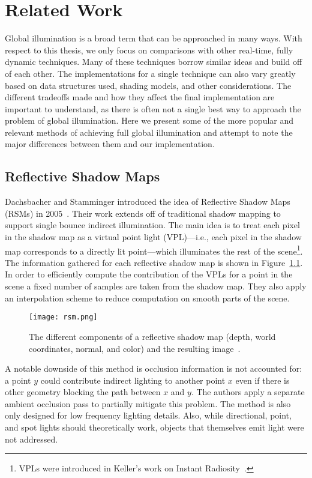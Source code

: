 \chapter{Related Work}

Global illumination is a broad term that can be approached in many ways. With respect to this thesis, we only focus on comparisons with other real-time, fully dynamic techniques. Many of these techniques borrow similar ideas and build off of each other. The implementations for a single technique can also vary greatly based on data structures used, shading models, and other considerations. The different tradeoffs made and how they affect the final implementation are important to understand, as there is often not a single best way to approach the problem of global illumination. Here we present some of the more popular and relevant methods of achieving full global illumination and attempt to note the major differences between them and our implementation.

\section{Reflective Shadow Maps}
Dachsbacher and Stamminger introduced the idea of Reflective Shadow Maps (RSMs) in 2005~\cite{Dachsbacher:2005:RSM:1053427.1053460}. Their work extends off of traditional shadow mapping to support single bounce indirect illumination. The main idea is to treat each pixel in the shadow map as a virtual point light (VPL)---i.e., each pixel in the shadow map corresponds to a directly lit point---which illuminates the rest of the scene\footnote{VPLs were introduced in Keller's work on Instant Radiosity~\cite{Keller:1997:IR:258734.258769}.}. The information gathered for each reflective shadow map is shown in Figure~\ref{fig:rsm}. In order to efficiently compute the contribution of the VPLs for a point in the scene a fixed number of samples are taken from the shadow map. They also apply an interpolation scheme to reduce computation on smooth parts of the scene.

\begin{figure}[h]
    \centering
    \texttt{[image: rsm.png]}
    \caption{The different components of a reflective shadow map (depth, world coordinates, normal, and color) and the resulting image~\cite{Dachsbacher:2005:RSM:1053427.1053460}.}
    \label{fig:rsm}
\end{figure}

A notable downside of this method is occlusion information is not accounted for: a point $y$ could contribute indirect lighting to another point $x$ even if there is other geometry blocking the path between $x$ and $y$. The authors apply a separate ambient occlusion pass to partially mitigate this problem. The method is also only designed for low frequency lighting details. Also, while directional, point, and spot lights should theoretically work, objects that themselves emit light were not addressed.

